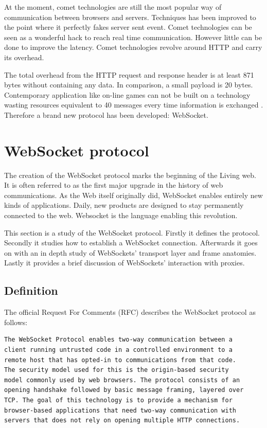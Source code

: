 At the moment, comet technologies are still the most popular way of
communication between browsers and servers. Techniques has been improved to
the point where it perfectly fakes server sent event. Comet technologies can be
seen as a wonderful hack to reach real time communication. However little can
be done to improve the latency. Comet technologies revolve around HTTP and
carry its overhead.

The total overhead from the HTTP request and response header is at least 871
bytes without containing any data. In comparison, a small payload is 20 bytes.
Contemporary application like on-line games can not be built on a technology
wasting resources equivalent to 40 messages every time information is 
exchanged \citep{Reference2}. Therefore a brand new protocol has been
developed: WebSocket.

\section{WebSocket protocol}

The creation of the WebSocket protocol marks the beginning of the Living web.
It is often referred to as the first major upgrade in the history of web
communications. As the Web itself originally did, WebSocket enables entirely
new kinds of applications. Daily, new products are designed to stay permanently
connected to the web. Websocket is the language enabling this revolution.

This section is a study of the WebSocket protocol. Firstly it defines the
protocol. Secondly it studies how to establish a WebSocket connection.
Afterwards it goes on with an in depth study of WebSockets' transport layer and
frame anatomies. Lastly it provides a brief discussion of WebSockets'
interaction with proxies.

\subsection{Definition}

The official Request For Comments \citep{Reference12} (RFC) describes the
WebSocket protocol as follows:

\begin{verbatim}
The WebSocket Protocol enables two-way communication between a 
client running untrusted code in a controlled environment to a 
remote host that has opted-in to communications from that code.
The security model used for this is the origin-based security 
model commonly used by web browsers. The protocol consists of an
opening handshake followed by basic message framing, layered over
TCP. The goal of this technology is to provide a mechanism for
browser-based applications that need two-way communication with
servers that does not rely on opening multiple HTTP connections.
\end{verbatim}

